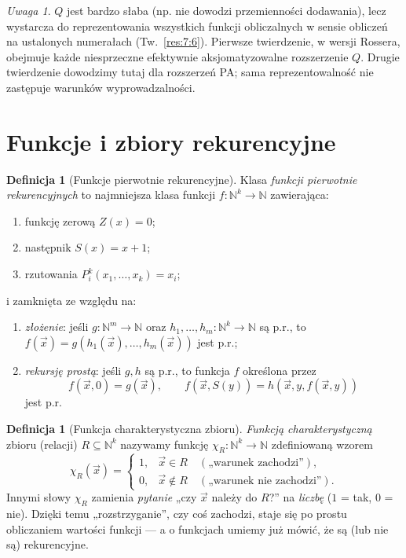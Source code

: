 \documentclass[11pt,a4paper]{article}
\numberwithin{equation}{section}
\theoremstyle{plain}
\theoremstyle{definition}
\newtheorem{definicja}[twierdzenie]{Definicja}
\theoremstyle{remark}
\newtheorem{uwaga}[twierdzenie]{Uwaga}
\begin{document}
\begin{uwaga}\label{res:4:11}
$Q$ jest bardzo słaba (np. nie dowodzi przemienności dodawania), lecz wystarcza do reprezentowania wszystkich funkcji obliczalnych w sensie obliczeń na ustalonych numerałach (Tw.~\ref{res:7:6}). Pierwsze twierdzenie, w wersji Rossera, obejmuje każde niesprzeczne efektywnie aksjomatyzowalne rozszerzenie $Q$. Drugie twierdzenie dowodzimy tutaj dla rozszerzeń PA; sama reprezentowalność nie zastępuje warunków wyprowadzalności.
\end{uwaga}

\section{Funkcje i zbiory rekurencyjne}\label{sec:funkcje-rekurencyjne}
\begin{definicja}[Funkcje pierwotnie rekurencyjne]\label{res:5:1}
Klasa \emph{funkcji pierwotnie rekurencyjnych} to najmniejsza klasa funkcji $f:\mathbb N^k\to\mathbb N$ zawierająca:
\begin{enumerate}[label=(\roman*)]
\item funkcję zerową $Z(x)=0$;
\item następnik $S(x)=x+1$;
\item rzutowania $P_i^k(x_1,\ldots,x_k)=x_i$;
\end{enumerate}
i zamknięta ze względu na:
\begin{enumerate}[label=(\alph*)]
\item \emph{złożenie}: jeśli $g:\mathbb N^m\to\mathbb N$ oraz $h_1,\ldots,h_m:\mathbb N^k\to\mathbb N$ są p.r., to $f(\vec x)=g(h_1(\vec x),\ldots,h_m(\vec x))$ jest p.r.;
\item \emph{rekursję prostą}: jeśli $g,h$ są p.r., to funkcja $f$ określona przez
\[
f(\vec x,0)=g(\vec x),\qquad f(\vec x,S(y))=h(\vec x,y,f(\vec x,y))
\]
jest p.r.
\end{enumerate}
\end{definicja}

\begin{definicja}[Funkcja charakterystyczna zbioru]\label{res:5:2}
\emph{Funkcją charakterystyczną} zbioru (relacji) $R\subseteq\mathbb N^k$ nazywamy funkcję $\chi_R:\mathbb N^k\to\mathbb N$ zdefiniowaną wzorem
\[
\chi_R(\vec x)=\begin{cases}1,&\vec x\in R\quad(\text{„warunek zachodzi”}),\\0,&\vec x\notin R\quad(\text{„warunek nie zachodzi”}).\end{cases}
\]
Innymi słowy $\chi_R$ zamienia \emph{pytanie} „czy $\vec x$ należy do $R$?” na \emph{liczbę} ($1$ = tak, $0$ = nie). Dzięki temu „rozstrzyganie”, czy coś zachodzi, staje się po prostu obliczaniem wartości funkcji --- a o funkcjach umiemy już mówić, że są (lub nie są) rekurencyjne.
\end{definicja}
\end{document}
